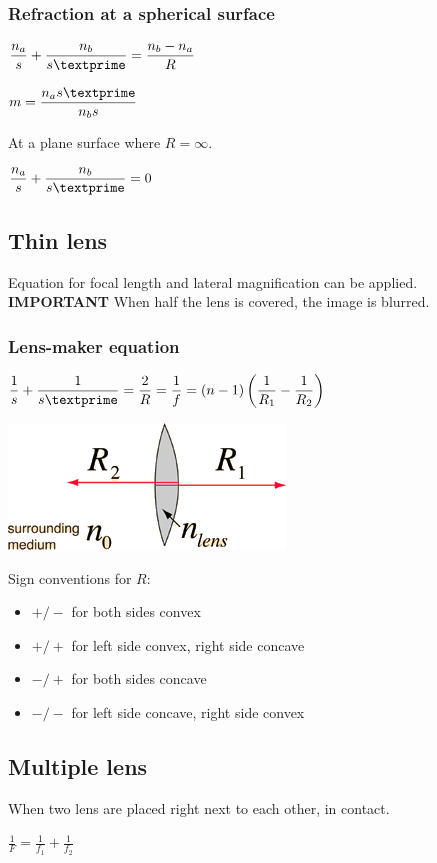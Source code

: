 \documentclass[a4paper]{article}
\begin{document}
\subsubsection{Refraction at a spherical surface}
\begin{center}
$\displaystyle\frac{n_a}{s} + \frac{n_b}{s\textprime} = \frac{n_b - n_a}{R}$
\end{center}
\begin{center}
$m = \displaystyle\frac{n_as\textprime}{n_bs}$
\end{center}
At a plane surface where $R = \infty$.
\begin{center}
$\displaystyle\frac{n_a}{s} + \frac{n_b}{s\textprime} = 0$
\end{center}
\subsection{Thin lens}
Equation for focal length and lateral magnification can be applied.
\newline
\textbf{IMPORTANT} When half the lens is covered, the image is blurred.
\subsubsection{Lens-maker equation}
\begin{center}
$\displaystyle \frac{1}{s} + \frac{1}{s\textprime} = \frac{2}{R} = \frac{1}{f} = (n - 1)\left(\frac{1}{R_1}-\frac{1}{R_2}\right)$
\end{center}
\begin{center}
\includegraphics[width=6 cm]{lenmaker.png}
\end{center}
Sign conventions for $R$:
\begin{itemize}
\item $+/-$ for both sides convex
\item $+/+$ for left side convex, right side concave
\item $-/+$ for both sides concave
\item $-/-$ for left side concave, right side convex
\end{itemize}
\subsection{Multiple lens}
When two lens are placed right next to each other, in contact.
\begin{center}
$\displaystyle\frac{1}{F} = \frac{1}{f_1} + \frac{1}{f_2}$
\end{center}
\end{document}
